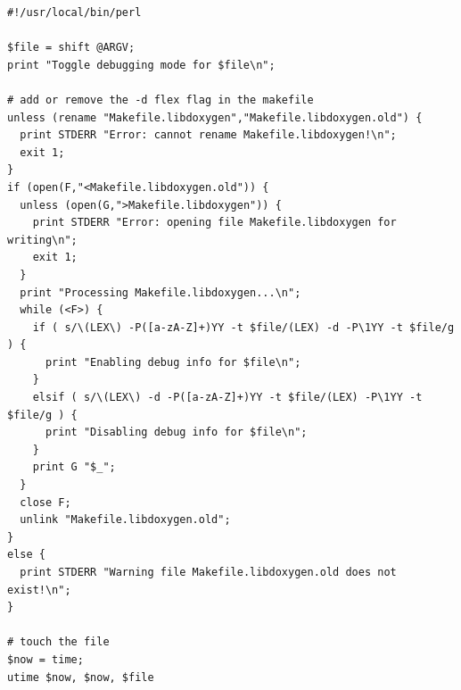 \footnotesize\begin{verbatim}
#!/usr/local/bin/perl 

$file = shift @ARGV;
print "Toggle debugging mode for $file\n";

# add or remove the -d flex flag in the makefile
unless (rename "Makefile.libdoxygen","Makefile.libdoxygen.old") {
  print STDERR "Error: cannot rename Makefile.libdoxygen!\n";
  exit 1;
}
if (open(F,"<Makefile.libdoxygen.old")) {
  unless (open(G,">Makefile.libdoxygen")) {
    print STDERR "Error: opening file Makefile.libdoxygen for writing\n";
    exit 1; 
  }
  print "Processing Makefile.libdoxygen...\n";
  while (<F>) {
    if ( s/\(LEX\) -P([a-zA-Z]+)YY -t $file/(LEX) -d -P\1YY -t $file/g ) {
      print "Enabling debug info for $file\n";
    }
    elsif ( s/\(LEX\) -d -P([a-zA-Z]+)YY -t $file/(LEX) -P\1YY -t $file/g ) {
      print "Disabling debug info for $file\n";
    }
    print G "$_";
  }
  close F;
  unlink "Makefile.libdoxygen.old";
}
else {
  print STDERR "Warning file Makefile.libdoxygen.old does not exist!\n"; 
}

# touch the file
$now = time;
utime $now, $now, $file
\end{verbatim}
\normalsize
 